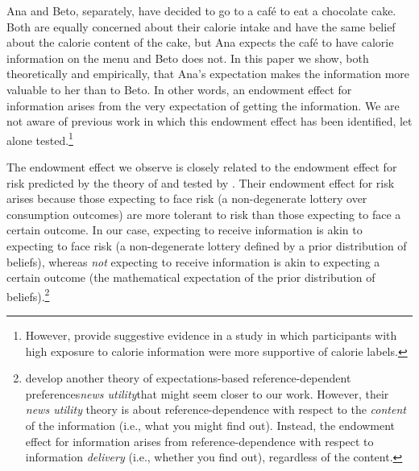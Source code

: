 Ana and Beto, separately, have decided to go to a café to eat a chocolate cake. Both are equally concerned about their calorie intake and have the same belief about the calorie content of the cake, but Ana expects the café to have calorie information on the menu and Beto does not. In this paper we show, both theoretically and empirically, that Ana’s expectation makes the information more valuable to her than to Beto.  In other words, an endowment effect for information arises from the very expectation of getting the information. We are not aware of previous work in which this endowment effect has been identified, let alone tested.\footnote{However, \citet{cawleyImpactInformationDisclosure} provide suggestive evidence in a study in which participants with high exposure to calorie information were more supportive of calorie labels.}

The endowment effect we observe is closely related to the endowment effect for risk predicted by the theory of \citet{koszegiReferenceDependentRiskAttitudes2007} and tested by \citet{sprengerEndowmentEffectRisk2015}. Their endowment effect for risk arises because those expecting to face risk (a non-degenerate lottery over consumption outcomes) are more tolerant to risk than those expecting to face a certain outcome. In our case, expecting to receive information is akin to expecting to face risk (a non-degenerate lottery defined by a prior distribution of beliefs), whereas \emph{not} expecting to receive information is akin to expecting a certain outcome (the mathematical expectation of the prior distribution of beliefs).\footnote{\citet{koszegiReferenceDependentConsumptionPlans2009} develop another theory of expectations-based reference-dependent preferences\textemdash\emph{news utility}\textemdash that might seem closer to our work. However, their \emph{news utility} theory is about reference-dependence with respect to the \emph{content} of the information (i.e., what you might find out). Instead, the endowment effect for information arises from reference-dependence with respect to information \emph{delivery} (i.e., whether you find out), regardless of the content.}


